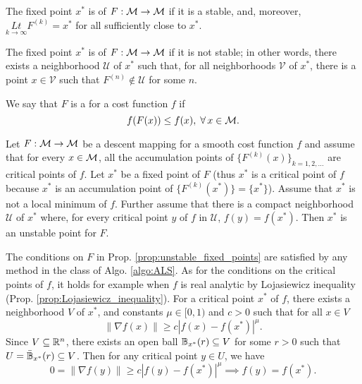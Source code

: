 \documentclass[11pt,a4paper]{article}
\begin{document}
\begin{mydef}
The fixed point $x^*$ is  of $F:\mathcal{M}\rightarrow \mathcal{M}$ if it is a stable, and, moreover, $\underset{k\rightarrow\infty}{Lt}F^{(k)} = x^*$ for all sufficiently close to $x^*$. 
\end{mydef}

\begin{mydef}
The fixed point $x^*$ is  of $F:\mathcal{M}\rightarrow \mathcal{M}$ if it is not stable; in other words, there exists a neighborhood $\mathcal{U}$ of $x^*$ such that, for all neighborhoods $\mathcal{V}$ of $x^*$, there is a point $x\in \mathcal{V}$ such that $F^{(n)}\notin \mathcal{U}$ for some $n$.
\end{mydef}

\begin{mydef}
We say that $F$ is a  for a cost function $f$ if 
\begin{equation*}
f(F(x))\le f(x),\;\forall\,x\in\mathcal{M}.
\end{equation*}
\end{mydef}

\begin{prop} \label{prop:unstable_fixed_points}
Let $F:\mathcal{M}\rightarrow \mathcal{M}$ be a descent mapping for a smooth cost function $f$ and assume that for every $x\in \mathcal{M}$, all the accumulation points of $\{F^{(k)}(x)\}_{k = 1,2,\ldots}$ are critical points of $f$. Let $x^*$ be a fixed point of $F$ (thus $x^*$ is a critical point of $f$ because $x^*$ is an accumulation point of $\{F^{(k)}(x^*)\} = \{x^*\}$). Assume that $x^*$ is not a local minimum of $f$. Further assume that there is a compact neighborhood $\mathcal{U}$ of $x^*$ where, for every critical point $y$ of $f$ in $\mathcal{U}$, $f(y) = f(x^*)$. Then $x^*$ is an unstable point for $F$.
\end{prop}

\begin{remark}
The conditions on $F$ in Prop. \ref{prop:unstable_fixed_points} are satisfied by any method in the class of Algo. \ref{algo:ALS}. As for the conditions on the critical points of $f$, it holds for example when $f$ is real analytic by Lojasiewicz inequality (Prop. \ref{prop:Lojasiewicz_inequality}). For a critical point $x^*$ of $f$, there exists a neighborhood $V$ of $x^*$, and constants $\mu\in[0,1)$ and $c>0$ such that for all $x\in V$
\begin{equation*}
\|\nabla f(x)\| \ge c|f(x)-f(x^*)|^\mu.
\end{equation*}
Since $V\subseteq \mathbb{R}^n$, there exists an open ball $\mathbb{B}_{x^*}(r)\subseteq V$ for some $r>0$ such that $U = \bar{\mathbb{B}}_{x^*}(r)\subseteq V$. Then for any critical point $y\in U$, we have
\begin{equation*}
0 = \|\nabla f(y)\| \ge c|f(y)-f(x^*)|^\mu \implies f(y) = f(x^*).
\end{equation*}
\end{remark}
\end{document}
